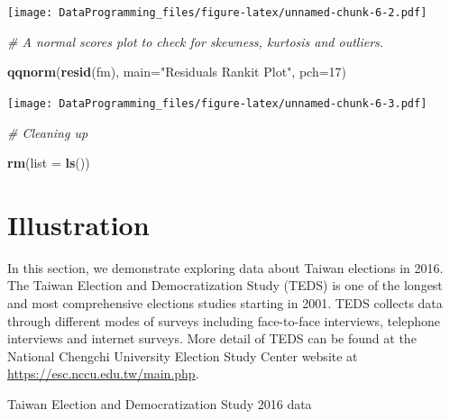 \documentclass[]{book}
\newenvironment{Shaded}{\begin{snugshade}}{\end{snugshade}}
\newcommand{\CommentTok}[1]{\textcolor[rgb]{0.56,0.35,0.01}{\textit{#1}}}
\newcommand{\DataTypeTok}[1]{\textcolor[rgb]{0.13,0.29,0.53}{#1}}
\newcommand{\DecValTok}[1]{\textcolor[rgb]{0.00,0.00,0.81}{#1}}
\newcommand{\KeywordTok}[1]{\textcolor[rgb]{0.13,0.29,0.53}{\textbf{#1}}}
\newcommand{\NormalTok}[1]{#1}
\newcommand{\StringTok}[1]{\textcolor[rgb]{0.31,0.60,0.02}{#1}}
\begin{document}
\texttt{[image: DataProgramming\_files/figure-latex/unnamed-chunk-6-2.pdf]}

\begin{Shaded}
\begin{Highlighting}[]
\CommentTok{# A normal scores plot to check for skewness, kurtosis and outliers.}

\KeywordTok{qqnorm}\NormalTok{(}\KeywordTok{resid}\NormalTok{(fm), }\DataTypeTok{main=}\StringTok{"Residuals Rankit Plot"}\NormalTok{, }\DataTypeTok{pch=}\DecValTok{17}\NormalTok{)}
\end{Highlighting}
\end{Shaded}

\texttt{[image: DataProgramming\_files/figure-latex/unnamed-chunk-6-3.pdf]}

\begin{Shaded}
\begin{Highlighting}[]
\CommentTok{# Cleaning up}

\KeywordTok{rm}\NormalTok{(}\DataTypeTok{list =} \KeywordTok{ls}\NormalTok{())}
\end{Highlighting}
\end{Shaded}

\hypertarget{illustration}{%
\section{Illustration}\label{illustration}}

In this section, we demonstrate exploring data about Taiwan elections in 2016. The Taiwan Election and Democratization Study (TEDS) is one of the longest and most comprehensive elections studies starting in 2001. TEDS collects data through different modes of surveys including face-to-face interviews, telephone interviews and internet surveys. More detail of TEDS can be found at the National Chengchi University Election Study Center website at \url{https://esc.nccu.edu.tw/main.php}.

Taiwan Election and Democratization Study 2016 data
\end{document}
